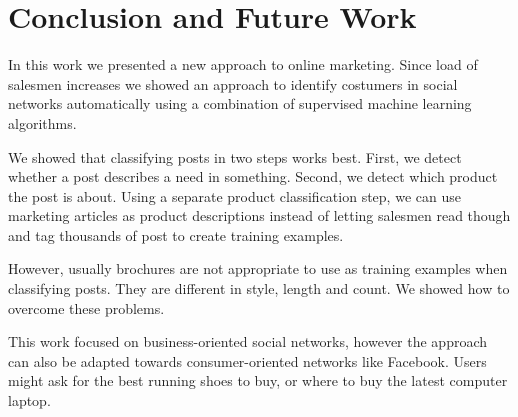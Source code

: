 \section{Conclusion and Future Work}
\label{sec:conclusion}

In this work we presented a new approach to online marketing. Since load of salesmen increases we showed an approach to identify costumers in social networks automatically using a combination of supervised machine learning algorithms.

We showed that classifying posts in two steps works best. 
First, we detect whether a post describes a need in something.
Second, we detect which product the post is about.
Using a separate product classification step, we can use marketing articles as product descriptions instead of letting salesmen read though and tag thousands of post to create training examples.

However, usually brochures are not appropriate to use as training examples when classifying posts.
They are different in style, length and count. 
We showed how to overcome these problems.

This work focused on business-oriented social networks, however the approach can also be adapted towards consumer-oriented networks like Facebook.
Users might ask for the best running shoes to buy, or where to buy the latest computer laptop.


